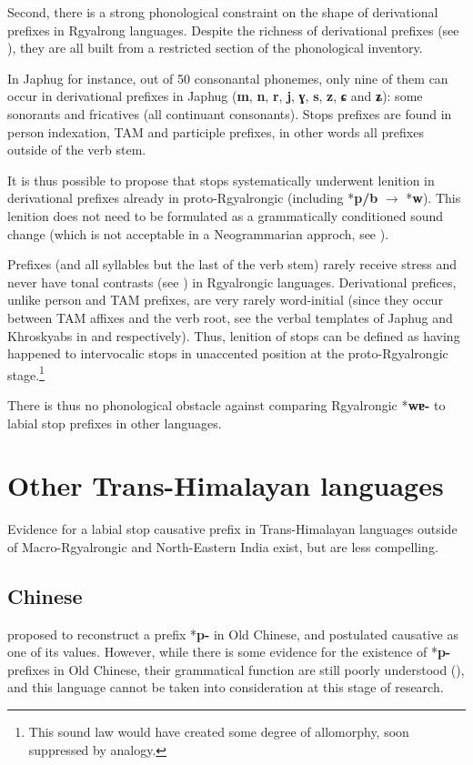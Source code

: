 \documentclass[oneside,a4paper,11pt]{article}
\newcommand{\ipa}[1]{\textbf{{\phon\mbox{#1}}}} %
\begin{document}
Second, there is a strong phonological constraint on the shape of derivational prefixes in Rgyalrong languages. Despite the richness of derivational prefixes (see \citealt{jackson14morpho, jacques14antipassive}), they are all built from a restricted section of the phonological inventory.

In Japhug for instance, out of 50 consonantal phonemes, only nine of them can occur in derivational prefixes in Japhug (\ipa{m}, \ipa{n}, \ipa{r}, \ipa{j}, \ipa{ɣ}, \ipa{s}, \ipa{z}, \ipa{ɕ} and \ipa{ʑ}): some sonorants and fricatives (all continuant consonants). Stops prefixes are found in person indexation, TAM and participle prefixes, in other words all prefixes outside of the verb stem. 

It is thus possible to propose that stops systematically underwent lenition in derivational prefixes already in proto-Rgyalrongic (including *\ipa{p/b} $\rightarrow$ *\ipa{w}). This lenition does not need to be formulated as a grammatically conditioned sound change (which is not acceptable in a  Neogrammarian approch, see \citealt{hill14conditioned}). 

Prefixes (and all syllables but the last of the verb stem) rarely receive stress and never have tonal contrasts (see \citealt{jackson05yingao}) in Rgyalrongic languages. Derivational prefices, unlike person and TAM prefixes, are very rarely word-initial (since they occur between TAM affixes and the verb root, see the verbal templates of Japhug and Khroskyabs in \citealt{jacques13harmonization} and \citealt{lai15person} respectively). Thus, lenition of stops can be defined as having happened to intervocalic stops in unaccented position at the proto-Rgyalrongic stage.\footnote{This sound law would have created some degree of allomorphy, soon suppressed by analogy.}

There is thus no phonological obstacle against comparing Rgyalrongic *\ipa{wɐ-} to labial stop prefixes in other languages.

 \section{Other Trans-Himalayan languages} 
Evidence for a labial stop causative  prefix in Trans-Himalayan languages outside of Macro-Rgyalrongic and North-Eastern India exist, but are less compelling.

\subsection{Chinese}
 \citet[593]{maspero52} proposed to reconstruct a prefix *\ipa{p-} in Old Chinese, and postulated causative as one of its values. However,  while there is some evidence for the existence of *\ipa{p-} prefixes in Old Chinese, their grammatical function are still poorly understood (\citealt[87-9]{sagart99roc}), and this language cannot be taken into consideration at this stage of research.
 
\end{document}
